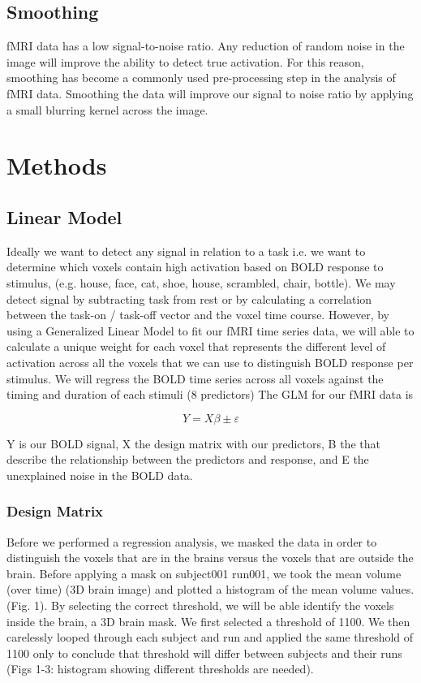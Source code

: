 \documentclass[12pt]{article}
\begin{document}
\subsection{Smoothing}

fMRI data has a low signal-to-noise ratio. Any reduction of random noise in the 
image will improve the ability to detect true activation.  For this reason, 
smoothing has become a commonly used pre-processing step in the analysis of fMRI 
data. Smoothing the data will improve our signal to noise ratio by applying a 
small blurring kernel across the image.

\section{Methods}

\subsection{Linear Model}
Ideally we want to detect any signal in relation to a task i.e. we want to 
determine which voxels contain high activation based on BOLD response to 
stimulus, (e.g. house, face, cat, shoe, house, scrambled, chair, bottle). We 
may detect signal by subtracting task from rest or by calculating a correlation 
between the task-on / task-off vector and the voxel time course. However, by 
using a Generalized Linear Model to fit our fMRI time series data, we will able 
to calculate a unique weight for each voxel that represents the different level 
of activation across all the voxels that we can use to distinguish BOLD 
response per stimulus.  We will regress the BOLD time series across all voxels 
against the timing and duration of each stimuli (8 predictors) The GLM for our 
fMRI data is

\begin{equation}
        Y = X\beta \pm \varepsilon
\end{equation}


Y is our BOLD signal, X the design matrix with our predictors, B the that 
describe the relationship between the predictors and response, and E the 
unexplained noise in the BOLD data.

\subsubsection{Design Matrix}
Before we performed a regression analysis, we masked the data in order to 
distinguish the voxels that are in the brains versus the voxels that are 
outside the brain. Before applying a mask on subject001 run001, we took 
the mean volume (over time) (3D brain image) and plotted a histogram of the 
mean volume values. (Fig. 1). By selecting the correct threshold, we will be 
able identify the voxels inside the brain, a 3D brain mask. We first selected a 
threshold of 1100. We then carelessly looped through each subject and run and 
applied the same threshold of 1100 only to conclude that threshold will differ 
between subjects and their runs (Figs 1-3: histogram showing different 
thresholds are needed). 
\end{document}
